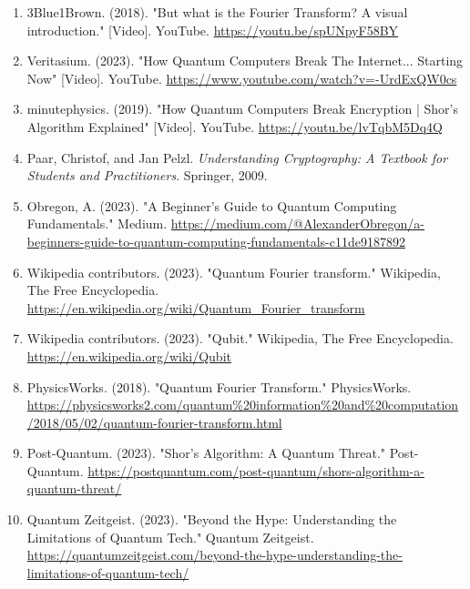 \documentclass{article}
\begin{document}
\begin{enumerate}
    \item 3Blue1Brown. (2018). "But what is the Fourier Transform? A visual introduction." [Video]. YouTube.
          \url{https://youtu.be/spUNpyF58BY}

    \item Veritasium. (2023). "How Quantum Computers Break The Internet... Starting Now" [Video]. YouTube.
          \url{https://www.youtube.com/watch?v=-UrdExQW0cs}

    \item minutephysics. (2019). "How Quantum Computers Break Encryption | Shor's Algorithm Explained" [Video]. YouTube.
          \url{https://youtu.be/lvTqbM5Dq4Q}

    \item Paar, Christof, and Jan Pelzl. \textit{Understanding Cryptography: A Textbook for Students and Practitioners}. Springer, 2009.

    \item Obregon, A. (2023). "A Beginner's Guide to Quantum Computing Fundamentals." Medium.
          \url{https://medium.com/@AlexanderObregon/a-beginners-guide-to-quantum-computing-fundamentals-c11de9187892}

    \item Wikipedia contributors. (2023). "Quantum Fourier transform." Wikipedia, The Free Encyclopedia.
          \url{https://en.wikipedia.org/wiki/Quantum_Fourier_transform}

    \item Wikipedia contributors. (2023). "Qubit." Wikipedia, The Free Encyclopedia.
          \url{https://en.wikipedia.org/wiki/Qubit}

    \item PhysicsWorks. (2018). "Quantum Fourier Transform." PhysicsWorks.
          \url{https://physicsworks2.com/quantum%20information%20and%20computation/2018/05/02/quantum-fourier-transform.html}

    \item Post-Quantum. (2023). "Shor's Algorithm: A Quantum Threat." Post-Quantum.
          \url{https://postquantum.com/post-quantum/shors-algorithm-a-quantum-threat/}

    \item Quantum Zeitgeist. (2023). "Beyond the Hype: Understanding the Limitations of Quantum Tech." Quantum Zeitgeist.
          \url{https://quantumzeitgeist.com/beyond-the-hype-understanding-the-limitations-of-quantum-tech/}
\end{enumerate}
\end{document}
